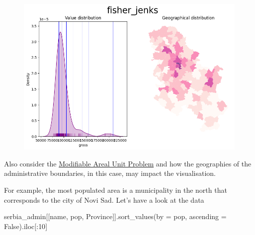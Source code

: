 \documentclass[
  letterpaper,
  DIV=11,
  numbers=noendperiod]{scrreprt}
\newenvironment{Shaded}{\begin{snugshade}}{\end{snugshade}}
\newcommand{\DecValTok}[1]{\textcolor[rgb]{0.68,0.00,0.00}{#1}}
\newcommand{\NormalTok}[1]{\textcolor[rgb]{0.00,0.23,0.31}{#1}}
\newcommand{\OperatorTok}[1]{\textcolor[rgb]{0.37,0.37,0.37}{#1}}
\newcommand{\StringTok}[1]{\textcolor[rgb]{0.13,0.47,0.30}{#1}}
\newcommand{\VariableTok}[1]{\textcolor[rgb]{0.07,0.07,0.07}{#1}}
\begin{document}
\begin{figure}[H]

{\centering \includegraphics{labs/w02_maps_files/figure-pdf/cell-35-output-3.png}

}

\end{figure}

Also consider the
\href{https://en.wikipedia.org/wiki/Modifiable_areal_unit_problem}{Modifiable
Areal Unit Problem} and how the geographies of the administrative
boundaries, in this case, may impact the visualisation.

For example, the most populated area is a municipality in the north that
corresponds to the city of Novi Sad. Let's have a look at the data

\begin{Shaded}
\begin{Highlighting}[]
\NormalTok{serbia\_admin[[}\StringTok{\textquotesingle{}name\textquotesingle{}}\NormalTok{, }\StringTok{\textquotesingle{}pop\textquotesingle{}}\NormalTok{, }\StringTok{\textquotesingle{}Province\textquotesingle{}}\NormalTok{]].sort\_values(by }\OperatorTok{=} \StringTok{\textquotesingle{}pop\textquotesingle{}}\NormalTok{, ascending }\OperatorTok{=} \VariableTok{False}\NormalTok{).iloc[:}\DecValTok{10}\NormalTok{]}
\end{Highlighting}
\end{Shaded}
\end{document}
